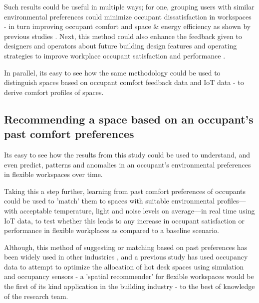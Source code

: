 \documentclass[]{interact}
\theoremstyle{plain}%
\theoremstyle{definition}
\theoremstyle{remark}
\begin{document}
Such results could be useful in multiple ways; for one, grouping users with similar environmental preferences could minimize occupant dissatisfaction in workspaces - in turn improving occupant comfort and space \& energy efficiency as shown by previous studies \cite{KAMARULZAMAN2011262}. Next, this method could also enhance the feedback given to designers and operators about future building design features and operating strategies to improve workplace occupant satisfaction and performance \cite{KWON2019356}.

In parallel, its easy to see how the same methodology could be used to distinguish spaces based on occupant comfort feedback data and IoT data - to derive comfort profiles of spaces.



\subsection{Recommending a space based on an occupant's past comfort preferences}

Its easy to see how the results from this study could be used to understand, and even predict, patterns and anomalies in an occupant's environmental preferences in flexible workspaces over time.

Taking this a step further, learning from past comfort preferences of occupants could be used to 'match' them to spaces with suitable environmental profiles---with acceptable temperature, light and noise levels on average---in real time using IoT data, to test whether this leads to any increase in occupant satisfaction or performance in flexible workplaces as compared to a baseline scenario. 

Although, this method of suggesting or matching based on past preferences has been widely used in other industries \cite{Recommender, Resnick}, and a previous study has used occupancy data to attempt to optimize the allocation of hot desk spaces using simulation and occupancy sensors \cite{Cooper2017AnData} - a 'spatial recommender' for flexible workspaces would be the first of its kind application in the building industry - to the best of knowledge of the research team.   
\end{document}

